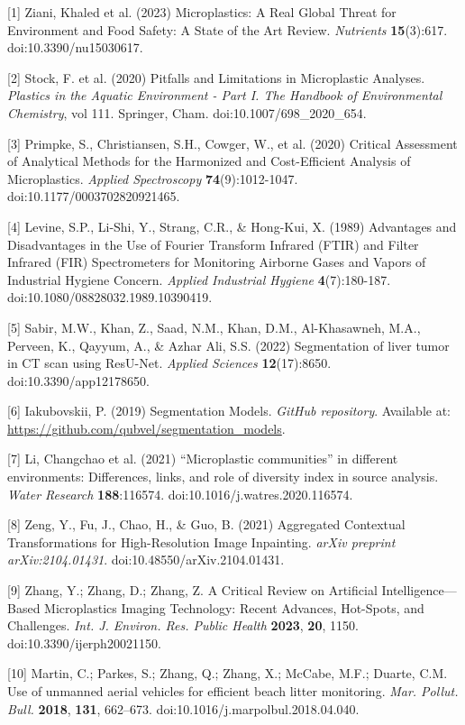 \documentclass{article}
\begin{document}
{\small

[1] Ziani, Khaled et al. (2023) Microplastics: A Real Global Threat for Environment and Food Safety: A State of the Art Review. \textit{Nutrients} \textbf{15}(3):617. doi:10.3390/nu15030617.

[2] Stock, F. et al. (2020) Pitfalls and Limitations in Microplastic Analyses. \textit{Plastics in the Aquatic Environment - Part I. The Handbook of Environmental Chemistry}, vol 111. Springer, Cham. doi:10.1007/698\_2020\_654.

[3] Primpke, S., Christiansen, S.H., Cowger, W., et al. (2020) Critical Assessment of Analytical Methods for the Harmonized and Cost-Efficient Analysis of Microplastics. \textit{Applied Spectroscopy} \textbf{74}(9):1012-1047. doi:10.1177/0003702820921465.

[4] Levine, S.P., Li-Shi, Y., Strang, C.R., \& Hong-Kui, X. (1989) Advantages and Disadvantages in the Use of Fourier Transform Infrared (FTIR) and Filter Infrared (FIR) Spectrometers for Monitoring Airborne Gases and Vapors of Industrial Hygiene Concern. \textit{Applied Industrial Hygiene} \textbf{4}(7):180-187. doi:10.1080/08828032.1989.10390419.

[5] Sabir, M.W., Khan, Z., Saad, N.M., Khan, D.M., Al-Khasawneh, M.A., Perveen, K., Qayyum, A., \& Azhar Ali, S.S. (2022) Segmentation of liver tumor in CT scan using ResU-Net. \textit{Applied Sciences} \textbf{12}(17):8650. doi:10.3390/app12178650.

[6] Iakubovskii, P. (2019) Segmentation Models. \textit{GitHub repository}. Available at: \url{https://github.com/qubvel/segmentation_models}.

[7] Li, Changchao et al. (2021) ``Microplastic communities'' in different environments: Differences, links, and role of diversity index in source analysis. \textit{Water Research} \textbf{188}:116574. doi:10.1016/j.watres.2020.116574.

[8] Zeng, Y., Fu, J., Chao, H., \& Guo, B. (2021) Aggregated Contextual Transformations for High-Resolution Image Inpainting. \textit{arXiv preprint arXiv:2104.01431}. doi:10.48550/arXiv.2104.01431.

[9] Zhang, Y.; Zhang, D.; Zhang, Z. A Critical Review on Artificial Intelligence---Based Microplastics Imaging Technology: Recent Advances, Hot-Spots, and Challenges. {\it Int. J. Environ. Res. Public Health} {\bf 2023}, {\bf 20}, 1150. doi:10.3390/ijerph20021150.

[10] Martin, C.; Parkes, S.; Zhang, Q.; Zhang, X.; McCabe, M.F.; Duarte, C.M. Use of unmanned aerial vehicles for efficient beach litter monitoring. {\it Mar. Pollut. Bull.} {\bf 2018}, {\bf 131}, 662--673. doi:10.1016/j.marpolbul.2018.04.040.

}
\end{document}

